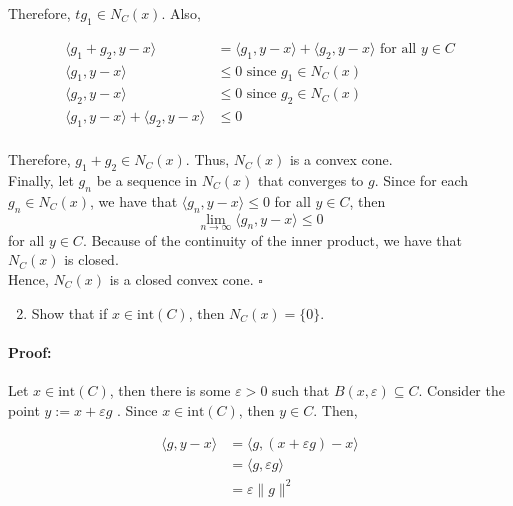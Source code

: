 \documentclass[10pt]{article}
\begin{document}
Therefore, $t g_1 \in N_C(x)$. Also, 

\begin{align*}
  \langle g_1 + g_2, y - x \rangle &= \langle g_1, y - x \rangle + \langle g_2, y - x \rangle \text{ for all } y \in C\\
  \langle g_1, y - x \rangle &\leq 0 \text{ since } g_1 \in N_C(x)\\
  \langle g_2, y - x \rangle &\leq 0 \text{ since } g_2 \in N_C(x)\\
  \langle g_1, y - x \rangle + \langle g_2, y - x \rangle &\leq 0\\
\end{align*}

Therefore, $g_1 + g_2 \in N_C(x)$. Thus, $N_C(x)$ is a convex cone.\\

Finally, let $g_n$ be a sequence in $N_C(x)$ that converges to $g$. Since for each 
$g_n \in N_C(x)$, we have that $\langle g_n, y - x \rangle \leq 0$ for all $y \in C$, 
then $$\lim_{n \to \infty} \langle g_n, y - x \rangle \leq 0$$ for all $y \in C$. Because
of the continuity of the inner product, we have that $N_C(x)$ is closed.\\

Hence, $N_C(x)$ is a closed convex cone. $\square$


\hfill \break %


\begin{enumerate}[label=(\alph*)]
  \setcounter{enumi}{1}
  \item Show that if $x \in \text{int}(C)$, then $N_C(x) = \{0\}$.
\end{enumerate}

\paragraph{Proof:}


Let $x \in \text{int}(C)$, then there is some 
$\varepsilon>0$ such that $B(x, \varepsilon) \subseteq C$. Consider the point 
$y:=x + \varepsilon g$ . Since $x \in \text{int}(C)$, then $y \in C$. 
Then, 

\begin{align*}
  \langle g, y - x \rangle &= \langle g, (x + \varepsilon g) - x \rangle\\
  &= \langle g, \varepsilon g \rangle\\
  &= \varepsilon \| g \|^2 \\
\end{align*}
\end{document}
